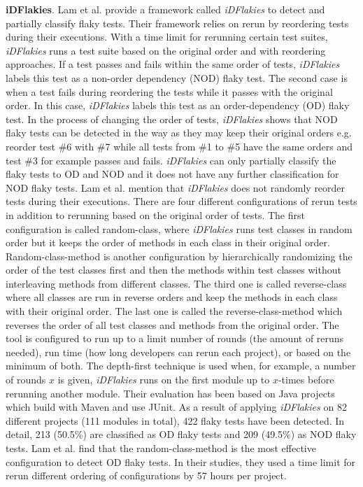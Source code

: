 \textbf{iDFlakies}. Lam et al. \cite{lam2019idflakies} provide a framework called \emph{iDFlakies} to detect and partially classify flaky tests. Their framework relies on rerun by reordering tests during their executions. With a time limit for rerunning certain test suites, \emph{iDFlakies} runs a test suite based on the original order and with reordering approaches. If a test passes and fails within the same order of tests, \emph{iDFlakies} labels this test as a non-order dependency (NOD) flaky test. The second case is when a test fails during reordering the tests while it passes with the original order. In this case, \emph{iDFlakies} labels this test as an order-dependency (OD) flaky test. In the process of changing the order of tests, \emph{iDFlakies} shows that NOD flaky tests can be detected in the way as they may keep their original orders e.g. reorder test \#6 with \#7 while all tests from \#1 to \#5 have the same orders and test \#3 for example passes and fails. \emph{iDFlakies} can only partially classify the flaky tests to OD and NOD and it does not have any further classification for NOD flaky tests. Lam et al. \cite{lam2019idflakies} mention that \emph{iDFlakies} does not randomly reorder tests during their executions. There are four different configurations of rerun tests in addition to rerunning based on the original order of tests. The first configuration is called random-class, where \emph{iDFlakies} runs test classes in random order but it keeps the order of methods in each class in their original order. Random-class-method is another configuration by hierarchically randomizing the order of the test classes first and then the methods within test classes without interleaving methods from different classes. The third one is called reverse-class where all classes are run in reverse orders and keep the methods in each class with their original order. The last one is called the reverse-class-method which reverses the order of all test classes and methods from the original order. The tool is configured to run up to a limit number of rounds (the amount of reruns needed), run time (how long developers can rerun each project), or based on the minimum of both. The depth-first technique is used when, for example, a number of rounds $x$ is given, \emph{iDFlakies} runs on the first module up to $x$-times before rerunning another module. Their evaluation has been based on Java projects which build with Maven and use JUnit. As a result of applying \emph{iDFlakies} on 82 different projects (111 modules in total), 422 flaky tests have been detected. In detail, 213 (50.5\%) are classified as OD flaky tests and 209 (49.5\%) as NOD flaky tests. Lam et al. \cite{lam2019idflakies} find that the random-class-method is the most effective configuration to detect OD flaky tests. In their studies, they used a time limit for rerun different ordering of configurations by 57 hours per project. 


